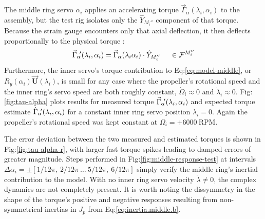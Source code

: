\par
The middle ring servo $\alpha_i$ applies an accelerating torque $\vec{\Gamma}_\alpha(\lambda_i,\alpha_i)$ to the assembly, but the test rig isolates only the $\hat{Y}_{M_i''}$ component of that torque. Because the strain gauge encounters only that axial deflection, it then deflects proportionally to the physical torque :
\begin{equation}
\vec{\Gamma}_\alpha\text{}\hspace{-2pt}'(\lambda_i,\alpha_i)=\vec{\Gamma}_\alpha(\lambda_i\alpha_i)\cdot\hat{Y}_{M_i''}~~~~\in\mathcal{F}^{M_i''}
\end{equation}
Furthermore, the inner servo's torque contribution to Eq:\ref{eq:model-middle}, or $R_y(\alpha_i)\vec{\mathbf{U}}(\lambda_i)$, is small for any case where the propeller's rotational speed and the inner ring's servo speed are both roughly constant, $\dot{\Omega}_i\approx 0$ and $\dot{\lambda}_i\approx 0$. Fig:\ref{fig:tau-alpha} plots results for measured torque $\vec{\Gamma}_\alpha\text{}\hspace{-2pt}'(\lambda_i,\alpha_i)$ and expected torque estimate $\hat{\Gamma}_\alpha\text{}\hspace{-2pt}'(\lambda_i,\alpha_i)$ for a constant inner ring servo position $\lambda_i=0$. Again the propeller's rotational speed was kept constant at $\Omega_i=+6000~\text{RPM}$. 
\par
The error deviation between the two measured and estimated torques is shown in Fig:\ref{fig:tau-alpha-r}, with larger fast torque spikes leading to damped errors of greater magnitude. Steps performed in Fig:\ref{fig:middle-response-test} at intervals $\Delta\alpha_i=\pm[1/12\pi,~2/12\pi~\ldots~5/12\pi,~6/12\pi]$ simply verify the middle ring's inertial contribution to the model. With no inner ring servo velocity $\dot\lambda\not=0$, the complex dynamics are not completely present. It is worth noting the dissymmetry in the shape of the torque's positive and negative responses resulting from non-symmetrical inertias in $J_p$ from Eq:\ref{eq:inertia.middle.b}.
